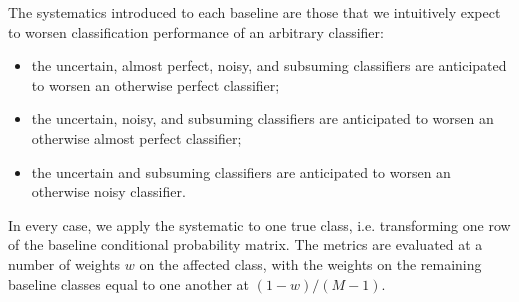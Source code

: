 The systematics introduced to each baseline are those that we intuitively expect to worsen classification performance of an arbitrary classifier:
\begin{itemize}
\item the uncertain, almost perfect, noisy, and subsuming classifiers are anticipated to worsen an otherwise perfect classifier;
\item the uncertain, noisy, and subsuming classifiers are anticipated to worsen an otherwise almost perfect classifier;
\item the uncertain and subsuming classifiers are anticipated to worsen an otherwise noisy classifier.
\end{itemize}

In every case, we apply the systematic to one true class, i.e. transforming one row of the baseline conditional probability matrix.
The metrics are evaluated at a number of weights $w$ on the affected class, with the weights on the remaining baseline classes equal to one another at $(1 - w) / (M - 1)$.



